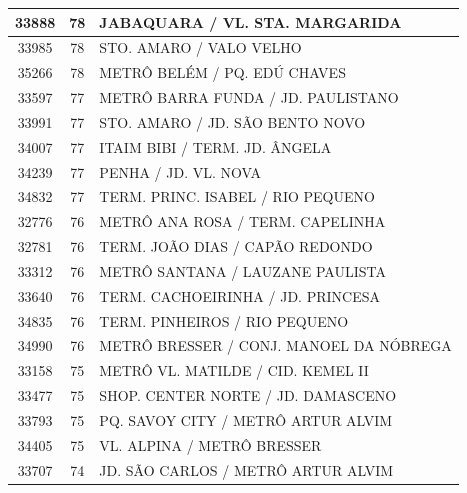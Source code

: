 \documentclass[
	12pt,				%
	oneside,			%
	a4paper,			%
	english,			%
	brazil				%
	]{abntex2ppgsi}
\begin{document}
{{\begin{apendicesenv}
\begin{longtable}{c|c|p{7cm}}
    33888 & 78    & JABAQUARA / VL. STA. MARGARIDA \\
\hline

    33985 & 78    & STO. AMARO / VALO VELHO \\
\hline

    35266 & 78    & METRÔ BELÉM / PQ. EDÚ CHAVES \\
\hline

    33597 & 77    & METRÔ BARRA FUNDA / JD. PAULISTANO \\
\hline

    33991 & 77    & STO. AMARO / JD. SÃO BENTO NOVO \\
\hline

    34007 & 77    & ITAIM BIBI / TERM. JD. ÂNGELA \\
\hline

    34239 & 77    & PENHA / JD. VL. NOVA \\
\hline

    34832 & 77    & TERM. PRINC. ISABEL / RIO PEQUENO \\
\hline

    32776 & 76    & METRÔ ANA ROSA / TERM. CAPELINHA \\
\hline

    32781 & 76    & TERM. JOÃO DIAS / CAPÃO REDONDO \\
\hline

    33312 & 76    & METRÔ SANTANA / LAUZANE PAULISTA \\
\hline

    33640 & 76    & TERM. CACHOEIRINHA / JD. PRINCESA \\
\hline

    34835 & 76    & TERM. PINHEIROS / RIO PEQUENO \\
\hline

    34990 & 76    & METRÔ BRESSER / CONJ. MANOEL DA NÓBREGA \\
\hline

    33158 & 75    & METRÔ VL. MATILDE / CID. KEMEL II \\
\hline

    33477 & 75    & SHOP. CENTER NORTE / JD. DAMASCENO \\
\hline

    33793 & 75    & PQ. SAVOY CITY / METRÔ ARTUR ALVIM \\
\hline

    34405 & 75    & VL. ALPINA / METRÔ BRESSER \\
\hline

    33707 & 74    & JD. SÃO CARLOS / METRÔ ARTUR ALVIM \\
\hline


\end{longtable}
\end{apendicesenv}}}
\end{document}
